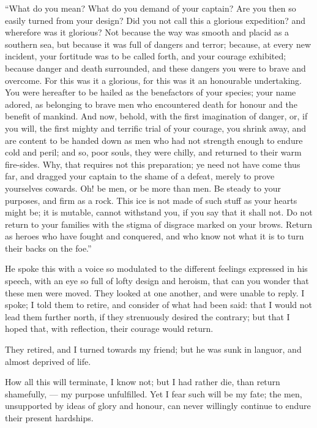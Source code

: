 ``What do you mean? What do
you demand of your captain? Are
you then so easily turned from your
design? Did you not call this a glorious
expedition? and wherefore was it
glorious? Not because the way was
smooth and placid as a southern sea,
but because it was full of dangers and
terror; because, at every new incident,
your fortitude was to be called forth,
and your courage exhibited; because
danger and death surrounded, and these
dangers you were to brave and overcome.
For this was it a glorious, for
this was it an honourable undertaking.
You were hereafter to be hailed as
the benefactors of your species; your
name adored, as belonging to brave
men who encountered death for honour
and the benefit of mankind. And
now, behold, with the first imagination
of danger, or, if you will, the first
mighty and terrific trial of your courage,
you shrink away, and are content
to be handed down as men who had
not strength enough to endure cold
and peril; and so, poor souls, they
were chilly, and returned to their warm
fire-sides. Why, that requires not this
preparation; ye need not have come
thus far, and dragged your captain to
the shame of a defeat, merely to prove
yourselves cowards. Oh! be men, or
be more than men. Be steady to your
purposes, and firm as a rock. This ice
is not made of such stuff as your hearts
might be; it is mutable, cannot withstand
you, if you say that it shall not.
Do not return to your families with the
stigma of disgrace marked on your
brows. Return as heroes who have
fought and conquered, and who know
not what it is to turn their backs on
the foe.''

He spoke this with a voice so modulated
to the different feelings expressed
in his speech, with an eye so full of
lofty design and heroism, that can you
wonder that these men were moved.
They looked at one another, and were
unable to reply. I spoke; I told them
to retire, and consider of what had been
said: that I would not lead them
further north, if they strenuously desired
the contrary; but that I hoped
that, with reflection, their courage
would return.

They retired, and I turned towards
my friend; but he was sunk in languor,
and almost deprived of life.

How all this will terminate, I know
not; but I had rather die, than return
shamefully, --- my purpose unfulfilled.
Yet I fear such will be my fate; the
men, unsupported by ideas of glory
and honour, can never willingly continue
to endure their present hardships.

\medskip
{}

